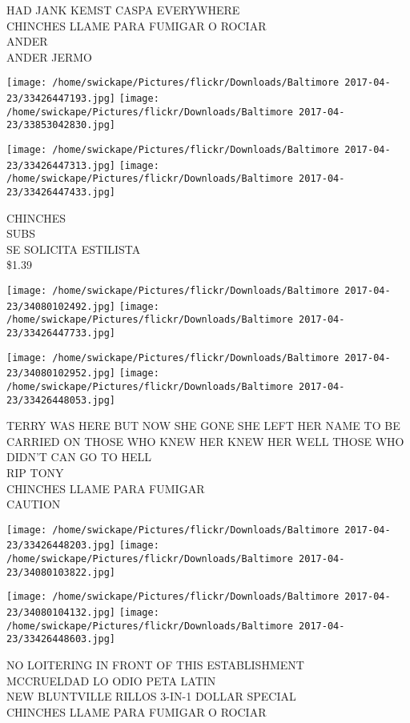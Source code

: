 \documentclass[10pt,letterpaper]{article}
\begin{document}
HAD JANK KEMST CASPA EVERYWHERE\\
CHINCHES LLAME PARA FUMIGAR O ROCIAR\\
ANDER\\
ANDER JERMO
\pagebreak

\texttt{[image: /home/swickape/Pictures/flickr/Downloads/Baltimore 2017-04-23/33426447193.jpg]}
\texttt{[image: /home/swickape/Pictures/flickr/Downloads/Baltimore 2017-04-23/33853042830.jpg]}

\texttt{[image: /home/swickape/Pictures/flickr/Downloads/Baltimore 2017-04-23/33426447313.jpg]}
\texttt{[image: /home/swickape/Pictures/flickr/Downloads/Baltimore 2017-04-23/33426447433.jpg]}

CHINCHES\\
SUBS\\
SE SOLICITA ESTILISTA\\
\$1.39
\pagebreak

\texttt{[image: /home/swickape/Pictures/flickr/Downloads/Baltimore 2017-04-23/34080102492.jpg]}
\texttt{[image: /home/swickape/Pictures/flickr/Downloads/Baltimore 2017-04-23/33426447733.jpg]}

\texttt{[image: /home/swickape/Pictures/flickr/Downloads/Baltimore 2017-04-23/34080102952.jpg]}
\texttt{[image: /home/swickape/Pictures/flickr/Downloads/Baltimore 2017-04-23/33426448053.jpg]}

TERRY WAS HERE BUT NOW SHE GONE SHE LEFT HER NAME TO BE CARRIED ON THOSE WHO KNEW HER KNEW HER WELL THOSE WHO DIDN'T CAN GO TO HELL\\
RIP TONY\\
CHINCHES LLAME PARA FUMIGAR\\
CAUTION
\pagebreak

\texttt{[image: /home/swickape/Pictures/flickr/Downloads/Baltimore 2017-04-23/33426448203.jpg]}
\texttt{[image: /home/swickape/Pictures/flickr/Downloads/Baltimore 2017-04-23/34080103822.jpg]}

\texttt{[image: /home/swickape/Pictures/flickr/Downloads/Baltimore 2017-04-23/34080104132.jpg]}
\texttt{[image: /home/swickape/Pictures/flickr/Downloads/Baltimore 2017-04-23/33426448603.jpg]}

NO LOITERING IN FRONT OF THIS ESTABLISHMENT\\
MCCRUELDAD LO ODIO PETA LATIN\\
NEW BLUNTVILLE RILLOS 3{-}IN{-}1 DOLLAR SPECIAL\\
CHINCHES LLAME PARA FUMIGAR O ROCIAR
\pagebreak
\end{document}
